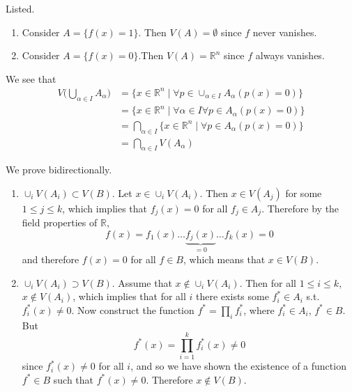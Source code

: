   \begin{solution}[a]
    Listed. 
    \begin{enumerate}
      \item Consider $A = \{ f(x) = 1\}$. Then $V(A) = \emptyset$ since $f$ never vanishes. 
      \item Consider $A = \{ f(x) = 0 \}$.Then $V(A) = \mathbb{R}^n$ since $f$ always vanishes. 
    \end{enumerate}
  \end{solution}
  \begin{solution}[b]
    We see that 
    \begin{align}
      V \bigg( \bigcup_{\alpha \in I} A_\alpha \bigg) & = \big\{ x \in \mathbb{R}^n \mid \forall p \in \cup_{\alpha \in I} A_\alpha ( p(x) = 0 )\big\} \\ 
                                                      & = \big\{ x \in \mathbb{R}^n \mid \forall \alpha \in I \forall p \in A_\alpha (p(x) = 0)  \big\} \\
                                                      & = \bigcap_{\alpha \in I} \big\{ x \in \mathbb{R}^n \mid \forall p \in A_\alpha (p(x) = 0) \big\} \\
                                                      & = \bigcap_{\alpha \in I} V(A_\alpha)
    \end{align}
  \end{solution}
  \begin{solution}[c]
    We prove bidirectionally. 
    \begin{enumerate}
      \item $\cup_{i} V(A_i) \subset V(B)$. Let $x \in \cup_i V(A_i)$. Then $x \in V(A_j)$ for some $1 \leq j \leq k$, which implies that $f_j (x) = 0$ for all $f_j \in A_j$. Therefore by the field properties of $\mathbb{R}$, 
      \begin{equation}
        f(x) = f_1 (x) \ldots \underbrace{f_j(x)}_{=0} \ldots f_k (x) = 0 
      \end{equation} 
      and therefore $f(x) = 0$ for all $f \in B$, which means that $x \in V(B)$. 

      \item $\cup_i V(A_i) \supset V(B)$. Assume that $x \not\in \cup_i V(A_i)$. Then for all $1 \leq i \leq k$, $x \not\in V(A_i)$, which implies that for all $i$ there exists some $f_i^{\ast} \in A_i$ s.t. $f_i^\ast (x) \neq 0$. Now construct the function $f^\ast = \prod_i f_i^\ast$, where $f_i^\ast \in A_i$, $f^\ast \in B$. But 
      \begin{equation}
        f^\ast (x) = \prod_{i=1}^k f_i^\ast (x) \neq 0
      \end{equation}
      since $f_i^\ast (x) \neq 0$ for all $i$, and so we have shown the existence of a function $f^\ast \in B$ such that $f^\ast (x) \neq 0$. Therefore $x \not\in V(B)$. 
    \end{enumerate}
  \end{solution}
